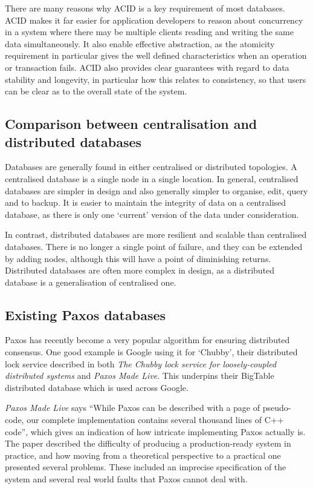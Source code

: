 \documentclass[12pt,twoside,notitlepage]{report}
\begin{document}
There are many reasons why ACID is a key requirement of most databases. ACID makes it far easier
for application developers to reason about concurrency in a system where there may be multiple
clients reading and writing the same data simultaneously. It also enable effective abstraction, as
the atomicity requirement in particular gives the well defined characteristics when an operation
or transaction fails. ACID also provides clear guarantees with regard to data stability and
longevity, in particular how this relates to consistency, so that users can be clear as to the
overall state of the system.

\subsection*{Comparison between centralisation and distributed databases}

Databases are generally found in either centralised or distributed topologies. A centralised
database is a single node in a single location. In general, centralised databases are simpler in
design and also generally simpler to organise, edit, query and to backup. It is
easier to maintain the integrity of data on a centralised database, as there is only one
`current' version of the data under consideration.

In contrast, distributed databases are more resilient and scalable than centralised databases.
There is no longer a single point of failure, and they can be extended by adding nodes, although
this will have a point of diminishing returns. Distributed databases are often more complex in
design, as a distributed database is a generalisation of centralised one.

\subsection*{Existing Paxos databases}

Paxos has recently become a very popular algorithm for ensuring distributed consensus. One good
example is Google using it for `Chubby', their distributed lock service described in both
\emph{The Chubby lock service for loosely-coupled distributed systems}\cite{burrows06} and
\emph{Paxos Made Live}\cite{chandra07}. This underpins their BigTable distributed database which
is used across Google.

\emph{Paxos Made Live}\cite{chandra07} says ``While Paxos can be described with a page of
pseudo-code, our complete implementation contains several thousand lines of C++ code'', which
gives an indication of how intricate implementing Paxos actually is.  The paper described the
difficulty of producing a production-ready system in practice, and how moving from a theoretical
perspective to a practical one presented several problems. These included an imprecise
specification of the system and several real world faults that Paxos cannot deal with.
\end{document}
